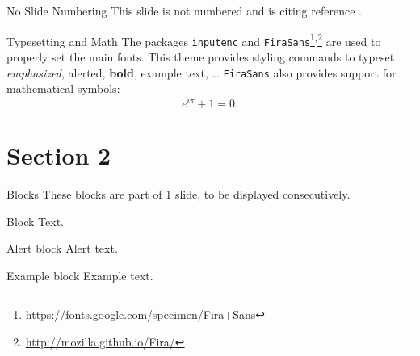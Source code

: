 \documentclass{beamer}
\begin{document}
\begin{frame}[noframenumbering]{No Slide Numbering}
	This slide is not numbered and is citing reference \cite{knuth74}.
\end{frame}


\begin{frame}{Typesetting and Math}
	The packages \texttt{inputenc} and \texttt{FiraSans}\footnote{\url{https://fonts.google.com/specimen/Fira+Sans}}\textsuperscript{,}\footnote{\url{http://mozilla.github.io/Fira/}} are used to properly set the main fonts.
	\vfill
	This theme provides styling commands to typeset \emph{emphasized}, \alert{alerted}, \textbf{bold}, \textcolor{example}{example text}, \dots
	\vfill
	\texttt{FiraSans} also provides support for mathematical symbols:
	\begin{equation*}
		e^{i\pi} + 1 = 0.
	\end{equation*}
\end{frame}


\section{Section 2}


\begin{frame}{Blocks}
	These blocks are part of 1 slide, to be displayed consecutively.
	\begin{block}{Block}
		Text.
	\end{block}
	\pause %
	\begin{alertblock}{Alert block}
		Alert \alert{text}.
	\end{alertblock}
	\pause %
	\begin{exampleblock}{Example block}
		Example \textcolor{example}{text}.
	\end{exampleblock}
\end{frame}

\end{document}
